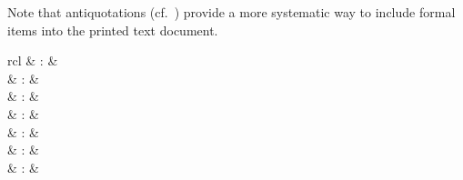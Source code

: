 \begin{isabellebody}
\begin{isamarkuptext}
  Note that antiquotations (cf.\ ) provide a more
  systematic way to include formal items into the printed text
  document.%
\end{isamarkuptext}%
\isamarkuptrue%
%
\isamarkuptrue%
%
\begin{isamarkuptext}%
\begin{matharray}{rcl}
    \hypertarget{command.print-commands}{\hyperlink{command.print-commands}{\mbox{}}}\isa{{\isachardoublequote}\isactrlsup {\isacharasterisk}{\isachardoublequote}} & : & \isarkeep{\cdot} \\
    \hypertarget{command.print-theory}{\hyperlink{command.print-theory}{\mbox{}}}\isa{{\isachardoublequote}\isactrlsup {\isacharasterisk}{\isachardoublequote}} & : &  \\
    \hypertarget{command.print-syntax}{\hyperlink{command.print-syntax}{\mbox{}}}\isa{{\isachardoublequote}\isactrlsup {\isacharasterisk}{\isachardoublequote}} & : &  \\
    \hypertarget{command.print-methods}{\hyperlink{command.print-methods}{\mbox{}}}\isa{{\isachardoublequote}\isactrlsup {\isacharasterisk}{\isachardoublequote}} & : &  \\
    \hypertarget{command.print-attributes}{\hyperlink{command.print-attributes}{\mbox{}}}\isa{{\isachardoublequote}\isactrlsup {\isacharasterisk}{\isachardoublequote}} & : &  \\
    \hypertarget{command.print-theorems}{\hyperlink{command.print-theorems}{\mbox{}}}\isa{{\isachardoublequote}\isactrlsup {\isacharasterisk}{\isachardoublequote}} & : &  \\
    \hypertarget{command.find-theorems}{\hyperlink{command.find-theorems}{\mbox{}}}\isa{{\isachardoublequote}\isactrlsup {\isacharasterisk}{\isachardoublequote}} & : &  \\

\end{matharray}
\end{isamarkuptext}
\end{isabellebody}
